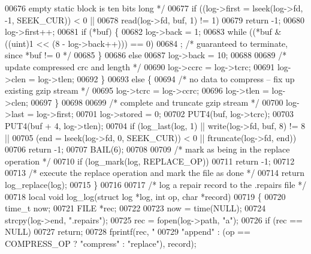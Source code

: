 \begin{DoxyCode}
00676 \textcolor{comment}{           empty static block is ten bits long */}
00677         \textcolor{keywordflow}{if} ((log->first = lseek(log->fd, -1, SEEK\_CUR)) < 0 ||
00678             read(log->fd, buf, 1) != 1)
00679             \textcolor{keywordflow}{return} -1;
00680         log->first++;
00681         \textcolor{keywordflow}{if} (*buf) \{
00682             log->back = 1;
00683             \textcolor{keywordflow}{while} ((*buf & ((uint)1 << (8 - log->back++))) == 0)
00684                 ;       \textcolor{comment}{/* guaranteed to terminate, since *buf != 0 */}
00685         \}
00686         \textcolor{keywordflow}{else}
00687             log->back = 10;
00688 
00689         \textcolor{comment}{/* update compressed crc and length */}
00690         log->ccrc = log->tcrc;
00691         log->clen = log->tlen;
00692     \}
00693     \textcolor{keywordflow}{else} \{
00694         \textcolor{comment}{/* no data to compress -- fix up existing gzip stream */}
00695         log->tcrc = log->ccrc;
00696         log->tlen = log->clen;
00697     \}
00698 
00699     \textcolor{comment}{/* complete and truncate gzip stream */}
00700     log->last = log->first;
00701     log->stored = 0;
00702     PUT4(buf, log->tcrc);
00703     PUT4(buf + 4, log->tlen);
00704     \textcolor{keywordflow}{if} (log\_last(log, 1) || write(log->fd, buf, 8) != 8 ||
00705         (end = lseek(log->fd, 0, SEEK\_CUR)) < 0 || ftruncate(log->fd, end))
00706         \textcolor{keywordflow}{return} -1;
00707     BAIL(6);
00708 
00709     \textcolor{comment}{/* mark as being in the replace operation */}
00710     \textcolor{keywordflow}{if} (log\_mark(log, REPLACE\_OP))
00711         \textcolor{keywordflow}{return} -1;
00712 
00713     \textcolor{comment}{/* execute the replace operation and mark the file as done */}
00714     \textcolor{keywordflow}{return} log\_replace(log);
00715 \}
00716 
00717 \textcolor{comment}{/* log a repair record to the .repairs file */}
00718 local \textcolor{keywordtype}{void} log\_log(\textcolor{keyword}{struct} log *log, \textcolor{keywordtype}{int} op, \textcolor{keywordtype}{char} *record)
00719 \{
00720     time\_t now;
00721     FILE *rec;
00722 
00723     now = time(NULL);
00724     strcpy(log->end, \textcolor{stringliteral}{".repairs"});
00725     rec = fopen(log->path, \textcolor{stringliteral}{"a"});
00726     \textcolor{keywordflow}{if} (rec == NULL)
00727         \textcolor{keywordflow}{return};
00728     fprintf(rec, \textcolor{stringliteral}{"%
00729             \textcolor{stringliteral}{"append"} : (op == COMPRESS\_OP ? \textcolor{stringliteral}{"compress"} : \textcolor{stringliteral}{"replace"}), record);
}
\end{DoxyCode}
